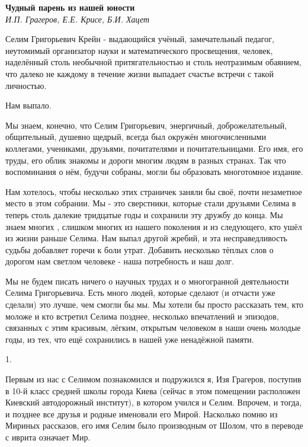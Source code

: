 \begin{center}{ \bf  Чудный парень из нашей юности}\\
{\it И.П. Грагеров, Е.Е. Крисе, Б.И. Хацет } \\
\end{center}
Селим Григорьевич Крейн - выдающийся учёный, замечательный педагог, неутомимый организатор науки и математического просвещения, человек, наделённый столь необычной притягательностью и столь неотразимым обаянием, что далеко не каждому в течение жизни выпадает счастье встречи с такой личностью.

Нам выпало.

Мы знаем, конечно, что Селим Григорьевич, энергичный, доброжелательный, общительный, душевно щедрый, всегда был окружён многочисленными коллегами, учениками, друзьями, почитателями и почитательницами. Его имя, его труды, его облик знакомы и дороги многим людям в разных странах. Так что воспоминания о нём, будучи собраны, могли бы образовать многотомное издание.

Нам хотелось, чтобы несколько этих страничек заняли бы своё, почти незаметное место в этом собрании. Мы - это сверстники, которые стали друзьями Селима в теперь столь далекие тридцатые годы и сохранили эту дружбу до конца. Мы знаем многих , слишком многих из нашего поколения и из следующего, кто ушёл из жизни раньше Селима. Нам выпал другой жребий, и эта несправедливость судьбы добавляет горечи к боли утрат. Добавить несколько тёплых слов о дорогом нам светлом человеке - наша потребность и наш долг.

Мы не будем писать ничего о научных трудах и о многогранной деятельности Селима Григорьевича. Есть много людей, которые сделают (и отчасти уже сделали) это лучше, чем смогли бы мы. Мы хотели бы просто рассказать тем, кто моложе и кто встретил Селима позднее, несколько впечатлений и эпизодов, связанных с этим красивым, лёгким, открытым человеком в наши очень молодые годы, из тех, что ещё сохранились в нашей уже ненадёжной памяти.

1.

Первым из нас с Селимом познакомился и подружился я, Изя Грагеров, поступив в 10-й класс средней школы города Киева (сейчас в этом помещении расположен Киевский автодорожный институт), в котором учился и Селим. Впрочем, и тогда, и позднее все друзья и родные именовали его Мирой. Насколько помню из Мириных рассказов, его имя Селим было производным от Шолом, что в переводе с иврита означает Мир.

